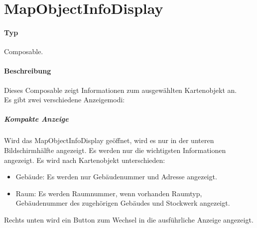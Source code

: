 \section{MapObjectInfoDisplay}
\paragraph*{Typ}
Composable.
\paragraph*{Beschreibung}
Dieses Composable zeigt Informationen zum ausgewählten Kartenobjekt an.\\
Es gibt zwei verschiedene Anzeigemodi:

\subparagraph*{Kompakte Anzeige}
Wird das MapObjectInfoDisplay geöffnet, wird es nur in der unteren Bildschirmhälfte angezeigt. 
Es werden nur die wichtigsten Informationen angezeigt. Es wird nach Kartenobjekt unterschieden:
\begin{itemize}
    \item Gebäude: Es werden nur Gebäudenummer und Adresse angezeigt.
    \item Raum: Es werden Raumnummer, wenn vorhanden Raumtyp, Gebäudenummer des zugehörigen Gebäudes und Stockwerk angezeigt.
\end{itemize}
Rechts unten wird ein Button zum Wechsel in die ausführliche Anzeige angezeigt.

